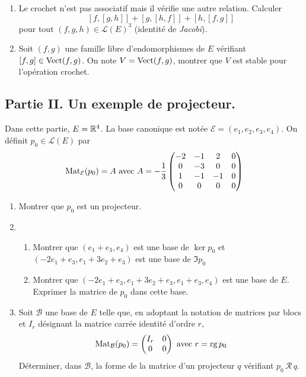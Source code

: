 \begin{enumerate}
\begin{enumerate}
  \item Le crochet n'est pas associatif mais il vérifie une autre relation. Calculer
\begin{displaymath}
  \left[ f, [g,h]\right] + \left[ g, [h,f]\right] + \left[ h, [f,g]\right] 
\end{displaymath}
pour tout $(f,g,h)\in \mathcal{L}(E)^3$ (identité de \emph{Jacobi}).
  \item Soit $(f,g)$ une famille libre d'endomorphismes de $E$ vérifiant $[f,g] \in \operatorname{Vect}(f,g)$. On note $V = \operatorname{Vect}(f,g)$, montrer que $V$ est stable pour l'opération crochet.
\end{enumerate}
\end{enumerate}

\subsection*{Partie II. Un exemple de projecteur.}
Dans cette partie, $E=\mathbb{R}^{4}$. La base canonique est notée $\mathcal{E}= (e_{1},e_{2},e_{3},e_{4})$.\newline
On définit $p_{0} \in \mathcal{L}(E)$ par
\begin{displaymath}
  \operatorname{Mat}_{\mathcal{E}}(p_0) = A \text{ avec }
A=-\frac{1}{3}
\begin{pmatrix}
-2 & -1 & 2 & 0 \\
0 & -3 & 0 & 0 \\
1 & -1 & -1 & 0 \\
0 & 0 & 0 & 0 
\end{pmatrix}
\end{displaymath}
\begin{enumerate}
  \item Montrer que $p_{0}$ est un projecteur.
\item \begin{enumerate}
\item Montrer que $(e_{1}+e_{3},e_{4})$ est une base de $\ker p_{0}$ et $(-2e_{1}+e_{3},e_{1}+3e_{2}+e_{3})$ est une base de $\Im p_{0}$
\item Montrer que $(-2e_{1}+e_{3},e_{1}+3e_{2}+e_{3},e_{1}+e_{3},e_{4})$ est une base de $E$. Exprimer la matrice de $p_{0}$ dans cette base.
\end{enumerate}
\item Soit $\mathcal{B}$ une base de $E$ telle que, en adoptant la notation de matrices par blocs et $I_{r}$ désignant la matrice carrée identité d'ordre $r$, 
\begin{displaymath}
\operatorname{Mat}_{\mathcal{B}}(p_{0}) =  
\begin{pmatrix}
I_{r} & 0 \\
 0    & 0 
\end{pmatrix}
\text{ avec } r = \operatorname{rg} p_{0}
\end{displaymath}
Déterminer, dans $\mathcal{B}$, la forme de la matrice d'un projecteur $q$ vérifiant $p_{0}\,\mathcal{R}\,q$.

\end{enumerate}

